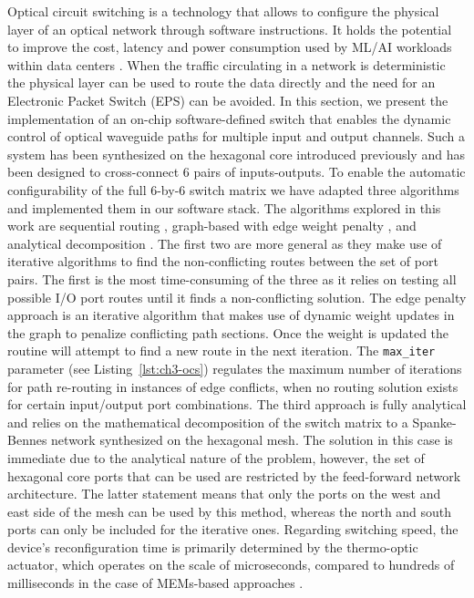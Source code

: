 Optical circuit switching is a technology that allows to configure the physical layer of an optical network through software instructions.
It holds the potential to improve the cost, latency and power consumption used by ML/AI workloads within data centers \cite{khani_sip-ml_2021,liu_lightwave_2023,sato_prospects_2022}.
When the traffic circulating in a network is deterministic the physical layer can be used to route the data directly and the need for an Electronic Packet Switch (EPS) can be avoided.
In this section, we present the implementation of an on-chip software-defined switch that enables the dynamic control of optical waveguide paths for multiple input and output channels.
Such a system has been synthesized on the hexagonal core introduced previously and has been designed to cross-connect 6 pairs of inputs-outputs.
To enable the automatic configurability of the full 6-by-6 switch matrix we have adapted three algorithms and implemented them in our software stack.
The algorithms explored in this work are sequential routing \cite{lopez_auto-routing_2020}, graph-based with edge weight penalty \cite{kerchove_automated_2023}, and analytical decomposition \cite{jia_six-port_2018}.
The first two are more general as they make use of iterative algorithms to find the non-conflicting routes between the set of port pairs.
The first is the most time-consuming of the three as it relies on testing all possible I/O port routes until it finds a non-conflicting solution.
The edge penalty approach is an iterative algorithm that makes use of dynamic weight updates in the graph to penalize conflicting path sections.
Once the weight is updated the routine will attempt to find a new route in the next iteration.
The \lstinline|max_iter| parameter (see Listing~\ref{lst:ch3-ocs}) regulates the maximum number of iterations for path re-routing in instances of edge conflicts, when no routing solution exists for certain input/output port combinations.
The third approach is fully analytical and relies on the mathematical decomposition of the switch matrix to a Spanke-Bennes network synthesized on the hexagonal mesh.
The solution in this case is immediate due to the analytical nature of the problem, however, the set of hexagonal core ports that can be used are restricted by the feed-forward network architecture.
The latter statement means that only the ports on the west and east side of the mesh can be used by this method, whereas the north and south ports can only be included for the iterative ones.
Regarding switching speed, the device's reconfiguration time is primarily determined by the thermo-optic actuator, which operates on the scale of microseconds, compared to hundreds of milliseconds in the case of MEMs-based approaches \cite{poutievski_jupiter_2022,urata_mission_2022}.

